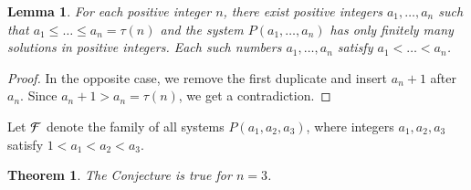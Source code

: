 \documentclass[conference]{IEEEtran}
\newtheorem{lemma}{Lemma}
\newtheorem{theorem}{Theorem}
\begin{document}
\begin{lemma}\label{lem5}
For each positive integer $n$, there exist positive integers \mbox{$a_1,\ldots,a_n$} such that
\mbox{$a_1 \leqslant \ldots \leqslant a_n=\tau(n)$} and the system \mbox{$P(a_1,\ldots,a_n)$}
has only finitely many solutions in positive integers.
Each such numbers \mbox{$a_1,\ldots,a_n$} satisfy \mbox{$a_1<\ldots<a_n$}.
\end{lemma}
\begin{proof}
In the opposite case, we remove the first duplicate and insert \mbox{$a_n+1$} \mbox{after $a_n$}.
Since \mbox{$a_n+1>a_n=\tau(n)$}, we get a contradiction.
\end{proof}
\par
Let ${\cal F}$ denote the family of all systems \mbox{$P(a_1,a_2,a_3)$}, where integers
\mbox{$a_1,a_2,a_3$} satisfy \mbox{$1<a_1<a_2<a_3$}.
\begin{theorem}\label{the9}
The Conjecture is true for \mbox{$n=3$}.
\end{theorem}
\end{document}
